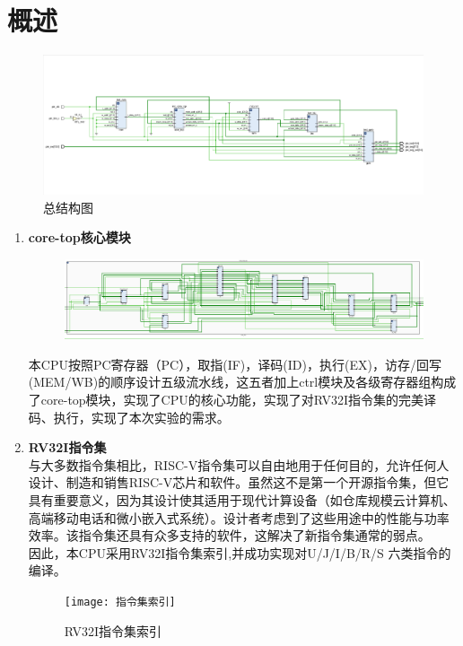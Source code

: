 \documentclass[lang=cn,11pt,a4paper]{elegantpaper}
\begin{document}
\section{概述}
\begin{figure}[h]
	\centering			
	\includegraphics[scale=0.4]{总结构图}
	\caption{总结构图}
\end{figure} 
	\begin{enumerate}
		
		\item \textbf{core-top核心模块}\\   
		\begin{figure}[h]
			\centering			
			\includegraphics[scale=0.5]{coretop}
		\end{figure} 
		 本CPU按照PC寄存器（PC），取指(IF)，译码(ID)，执行(EX)，访存/回写(MEM/WB)的顺序设计五级流水线，这五者加上ctrl模块及各级寄存器组构成了core-top模块，实现了CPU的核心功能，实现了对RV32I指令集的完美译码、执行，实现了本次实验的需求。
		\item \textbf{RV32I指令集} \\
		 与大多数指令集相比，RISC-V指令集可以自由地用于任何目的，允许任何人设计、制造和销售RISC-V芯片和软件。虽然这不是第一个开源指令集，但它具有重要意义，因为其设计使其适用于现代计算设备（如仓库规模云计算机、高端移动电话和微小嵌入式系统）。设计者考虑到了这些用途中的性能与功率效率。该指令集还具有众多支持的软件，这解决了新指令集通常的弱点。\\
		 因此，本CPU采用RV32I指令集索引,并成功实现对U/J/I/B/R/S 六类指令的编译。
		 \begin{figure}
		 	\centering
		 	\texttt{[image: 指令集索引]}
		 	\caption{RV32I指令集索引}
		 	\label{fig:}
		 \end{figure}
		 

\end{enumerate}
\end{document}
